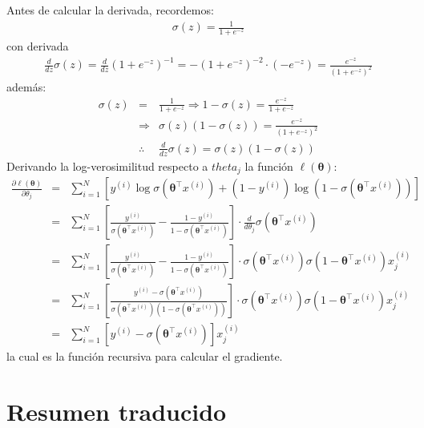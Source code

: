 \documentclass[12pt]{article}
\begin{document}
Antes de calcular la derivada, recordemos:
\begin{eqnarray}
\sigma(z) = \frac{1}{1 + e^{-z}}
\end{eqnarray}
con derivada
\begin{eqnarray}
\frac{d}{dz} \sigma(z) = \frac{d}{dz} \left(1 + e^{-z} \right)^{-1} = 
-(1 + e^{-z})^{-2} \cdot (-e^{-z}) =
\frac{e^{-z}}{(1 + e^{-z})^2}
\end{eqnarray}
además:
\begin{eqnarray}
\sigma(z) &=& \frac{1}{1 + e^{-z}} \Rightarrow 1 - \sigma(z) = \frac{e^{-z}}{1 + e^{-z}}\\
&\Rightarrow& \sigma(z)(1 - \sigma(z)) = \frac{e^{-z}}{(1 + e^{-z})^2}\\
&\therefore& \frac{d}{dz} \sigma(z) = \sigma(z)(1 - \sigma(z))
\end{eqnarray}
Derivando la log-verosimilitud respecto a $theta_{j}$ la función $\ell(\boldsymbol{\theta})$:
\begin{eqnarray}
\frac{\partial \ell(\boldsymbol{\theta})}{\partial \theta_j} &=& 
\sum_{i=1}^{N} \left[ y^{(i)} \log \sigma(\boldsymbol{\theta}^{\top} x^{(i)}) +
(1 - y^{(i)}) \log (1 - \sigma(\boldsymbol{\theta}^{\top} x^{(i)})) \right]\\
&=& \sum_{i=1}^{N} \left[ \frac{y^{(i)}}{\sigma(\boldsymbol{\theta}^{\top} x^{(i)})} 
- \frac{1 - y^{(i)}}{1 - \sigma(\boldsymbol{\theta}^{\top} x^{(i)})} \right]
\cdot \frac{d}{d\theta_j} \sigma(\boldsymbol{\theta}^{\top} x^{(i)})\\
&=& \sum_{i=1}^{N} \left[ \frac{y^{(i)}}{\sigma(\boldsymbol{\theta}^{\top} x^{(i)})} 
- \frac{1 - y^{(i)}}{1 - \sigma(\boldsymbol{\theta}^{\top} x^{(i)})} \right]
\cdot  \sigma(\boldsymbol{\theta}^{\top} x^{(i)})\sigma(1-\boldsymbol{\theta}^{\top} x^{(i)})x_{j}^{(i)}\\
&=& \sum_{i=1}^{N} \left[ \frac{y^{(i)}- \sigma(\boldsymbol{\theta}^{\top}x^{(i)})}
{\sigma(\boldsymbol{\theta}^{\top} x^{(i)})(1 - \sigma(\boldsymbol{\theta}^{\top} x^{(i)}))} \right]
\cdot  \sigma(\boldsymbol{\theta}^{\top} x^{(i)})\sigma(1-\boldsymbol{\theta}^{\top} x^{(i)})x_{j}^{(i)}\\
&=&\sum_{i=1}^{N}\left[y^{(i)}-\sigma(\boldsymbol{\theta}^{\top} x^{(i)})\right]x_{j}^{(i)} 
\end{eqnarray}
la cual es la funci\'on recursiva para calcular el gradiente.



\section*{Resumen traducido}
\end{document}
